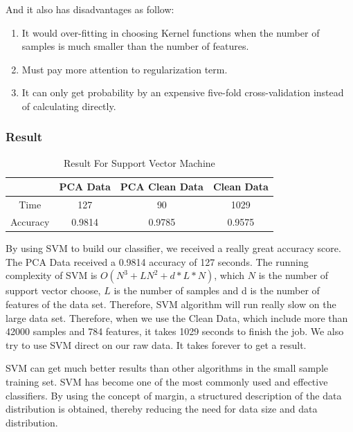 \documentclass[sigconf]{acmart}
\begin{document}
And it also has disadvantages as follow:
\begin{enumerate}
    \item It would over-fitting in choosing Kernel functions when the number of samples is much smaller than the number of features.
    \item Must pay more attention to regularization term.
    \item It can only get probability by an expensive five-fold cross-validation instead of calculating directly.
\end{enumerate}

\subsubsection{Result}

\begin{table}[htb]
    \centering
    \begin{tabular}{|c|c|c|c|} \hline
                 &  PCA Data & PCA Clean Data & Clean Data \\ \hline
        Time     &  127      & 90              & 1029      \\
        Accuracy &  0.9814   & 0.9785          & 0.9575    \\ \hline
    \end{tabular}
    \caption{Result For Support Vector Machine}
\end{table}

By using SVM to build our classifier, we received a really great accuracy score. The PCA Data received a 0.9814 accuracy of 127 seconds. 
The running complexity of SVM is $O(N^3+LN^2+d*L*N)$, which $N$ is the number of support vector choose, $L$ is the number of samples and d is the number of features of the data set. Therefore, SVM algorithm will run really slow on the large data set. Therefore, when we use the Clean Data, which include more than 42000 samples and 784 features, it takes 1029 seconds to finish the job. We also try to use SVM direct on our raw data. It takes forever to get a result.

SVM can get much better results than other algorithms in the small sample training set. SVM has become one of the most commonly used and effective classifiers. By using the concept of margin, a structured description of the data distribution is obtained, thereby reducing the need for data size and data distribution. 
\end{document}
